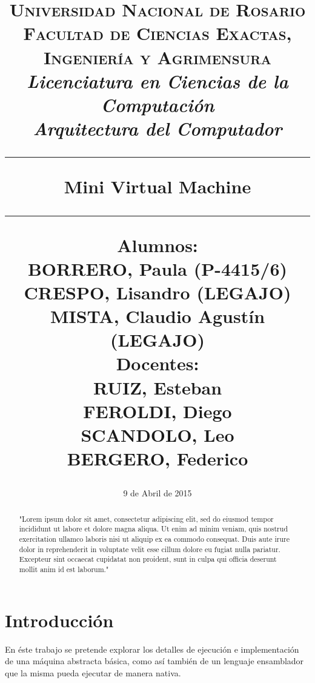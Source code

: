 \documentclass[a4paper,12pt]{article}
\title{
	\normalsize
		\textsc{Universidad Nacional de Rosario}\\	
		\textsc{Facultad de Ciencias Exactas, Ingenier\'ia y Agrimensura}\\
		\textit{Licenciatura en Ciencias de la Computaci\'on}\\
		\textit{Arquitectura del Computador}\\
	\vspace{30pt}
	\hrule{}
	\vspace{15pt}
	\huge
		\textbf{Mini Virtual Machine}\\
	\vspace{15pt}
	\hrule{}
	\vspace{30pt}
	\begin{multicols}{2}
	\raggedright
		\large
			\textbf{Alumnos:}\\
		\normalsize
			BORRERO, Paula (P-4415/6) \\
			CRESPO, Lisandro (LEGAJO) \\
			MISTA, Claudio Agust\'in (LEGAJO) \\
	\raggedleft
		\large
			\textbf{Docentes:}\\
		\normalsize
			RUIZ, Esteban \\
			FEROLDI, Diego \\
			SCANDOLO, Leo\\
			BERGERO, Federico\\
	\end{multicols}
}
\begin{document}
\date{9 de Abril de 2015}
\maketitle

\begin{abstract}
"Lorem ipsum dolor sit amet, consectetur adipiscing elit, sed do eiusmod tempor incididunt ut labore et dolore magna aliqua. Ut enim ad minim veniam, quis nostrud exercitation ullamco laboris nisi ut aliquip ex ea commodo consequat. Duis aute irure dolor in reprehenderit in voluptate velit esse cillum dolore eu fugiat nulla pariatur. Excepteur sint occaecat cupidatat non proident, sunt in culpa qui officia deserunt mollit anim id est laborum."
\end{abstract}

\pagebreak

\section{Introducci\'on}

	En \'este trabajo se pretende explorar los detalles de ejecuci\'on e implementaci\'on de una m\'aquina abstracta b\'asica, como as\'i tambi\'en de un lenguaje ensamblador que la misma pueda ejecutar de manera nativa.
	
\end{document}
